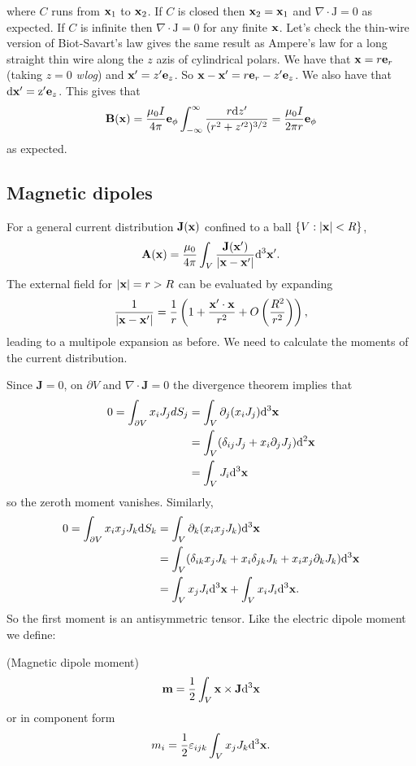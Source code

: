 \documentclass{article}
\begin{document}
where $ C $ runs from $ \mathbf{x}_1 $ to $ \mathbf{x}_2 $. If $ C $ is closed then $ \mathbf{x}_2=\mathbf{x}_1 $ and $ \nabla\cdot\mathrm J=0 $ as expected. If $ C $ is infinite then $ \nabla\cdot\mathrm J =0  $ for any finite $ \mathbf{x} $. Let's check the thin-wire version of Biot-Savart's law gives the same result as Ampere's law for a long straight thin wire along the $ z $ azis of cylindrical polars. We have that $ \mathbf{x} = r\mathbf e_r $ (taking $ z=0 $ \textit{wlog}) and $ \mathbf{x}'=z'\mathbf e_z $. So $ \mathbf{x}-\mathbf{x}'=r\mathbf e_r-z'\mathbf e_z $. We also have that $ \mathrm d\mathbf{x}'=\mathrm z'\mathbf e_z $. This gives that 
\[
	\mathbf B(\mathbf{x}) = \frac{\mu_0 I}{4\pi}\mathbf e_\phi\int_{-\infty}^\infty\frac{r\mathrm dz'}{(r^2+z'^2)^{3/2}}=\frac{\mu_0 I}{2\pi r}\mathbf e_\phi
\]
as expected.
\subsection{Magnetic dipoles}
For a general current distribution $ \mathbf J(\mathbf{x}) $ confined to a ball $ \{V:|\mathbf{x}|<R\} $,
\[
	\mathbf A(\mathbf{x}) = \frac{\mu_0}{4\pi} \int_V\frac{\mathbf J(\mathbf{x}')}{|\mathbf{x}-\mathbf{x}'|}\mathrm d^3\mathbf{x}'.
\]
The external field for $ |\mathbf{x}|=r>R $ can be evaluated by expanding
\[
	\frac 1{|\mathbf{x}-\mathbf{x}'|}=\frac 1r\left(1+\frac{\mathbf{x}'\cdot\mathbf{x}}{r^2} + O\left(\frac{R^2}{r^2}\right)\right),
\]
leading to a multipole expansion as before. We need to calculate the moments of the current distribution.
\par
Since $ \mathbf J = 0 $, on $ \partial V $ and $ \nabla\cdot\mathbf J = 0 $ the divergence theorem implies that
\begin{align*}
	0 = \int_{\partial V} x_iJ_j dS_j &= \int_V \partial_j (x_iJ_j)\mathrm d^3\mathbf{x}\\
						  &= \int_V(\delta_{ij} J_j +x_i \partial_j J_j)\mathrm d^2\mathbf{x}\\
						  &=\int_V J_i\mathrm d^3\mathbf{x}
\end{align*}
so the zeroth moment vanishes. Similarly,
\begin{align*}
	0 = \int_{\partial V} x_ix_jJ_k\mathrm dS_k &= \int_V\partial_k(x_ix_jJ_k)\mathrm d^3 \mathbf{x}\\
						    &=\int_V(\delta_{ik}x_jJ_k+x_i\delta_{jk}J_k+x_ix_j\partial_kJ_k)\mathrm d^3\mathbf{x}\\
						    &= \int_V x_jJ_i\mathrm d^3\mathbf{x}+\int_V x_iJ_i\mathrm d^3\mathbf{x}.
\end{align*}
So the first moment is an antisymmetric tensor. Like the electric dipole moment we define:
\begin{definition}
	(Magnetic dipole moment)
	\[
	  \mathbf m = \frac 12\int_V \mathbf{x}\times \mathbf J \mathrm d^3 \mathbf{x}
	\]
	or in component form
	\[
		m_i = \frac 12\varepsilon_{ijk}\int_V x_jJ_k\mathrm d^3 \mathbf{x}.
	\]
\end{definition}
\end{document}

